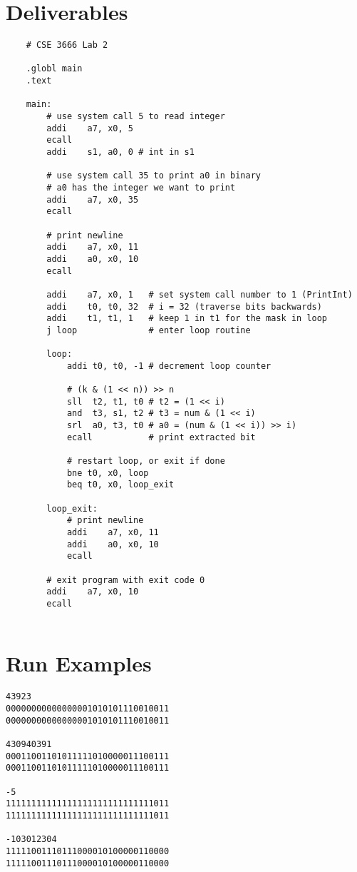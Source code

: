 \documentclass{article}
\begin{document}
\section{Deliverables}
    \begin{lstlisting}
    # CSE 3666 Lab 2

    .globl main
    .text
    
    main:          
        # use system call 5 to read integer
        addi    a7, x0, 5
        ecall
        addi    s1, a0, 0 # int in s1
    
        # use system call 35 to print a0 in binary
        # a0 has the integer we want to print
        addi    a7, x0, 35
        ecall
        
        # print newline
        addi    a7, x0, 11
        addi    a0, x0, 10
        ecall
        
        addi    a7, x0, 1   # set system call number to 1 (PrintInt)
        addi    t0, t0, 32  # i = 32 (traverse bits backwards)
        addi    t1, t1, 1   # keep 1 in t1 for the mask in loop
        j loop              # enter loop routine
        
        loop:
            addi t0, t0, -1 # decrement loop counter
            
            # (k & (1 << n)) >> n
            sll  t2, t1, t0 # t2 = (1 << i)
            and  t3, s1, t2 # t3 = num & (1 << i)
            srl  a0, t3, t0 # a0 = (num & (1 << i)) >> i)
            ecall           # print extracted bit
            
            # restart loop, or exit if done
            bne t0, x0, loop
            beq t0, x0, loop_exit
            
        loop_exit:
            # print newline
            addi    a7, x0, 11
            addi    a0, x0, 10
            ecall
        
        # exit program with exit code 0
        addi    a7, x0, 10      
        ecall
        
    \end{lstlisting}

\hfill \break
\section{Run Examples}
\begin{lstlisting}
43923
00000000000000001010101110010011
00000000000000001010101110010011

430940391
00011001101011111010000011100111
00011001101011111010000011100111

-5
11111111111111111111111111111011
11111111111111111111111111111011

-103012304
11111001110111000010100000110000
11111001110111000010100000110000
\end{lstlisting}
\end{document}
